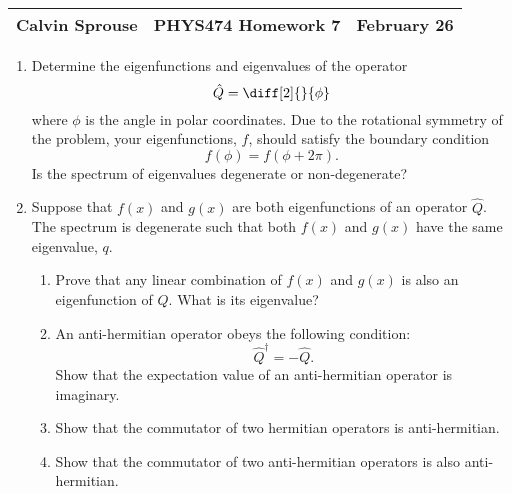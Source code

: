 \documentclass[a4paper, 12pt]{config/homework}
\begin{document}
\noindent
\begin{tabularx}{\textwidth}{>{\centering\arraybackslash}X>{\centering\arraybackslash}X>{\centering\arraybackslash}X}
Calvin Sprouse & PHYS474 Homework 7 & 2024 February 26\\
\midrule
\end{tabularx}

\begin{enumerate}
\item Determine the eigenfunctions and eigenvalues of the operator
\[\hat{Q} = \diff[2]{}{\phi}\]
where \(\phi\) is the angle in polar coordinates. Due to the rotational symmetry of the problem, your eigenfunctions, \(f\), should satisfy the boundary condition
\[f(\phi) = f(\phi + 2\pi).\]
Is the spectrum of eigenvalues degenerate or non-degenerate?



\pagebreak
\item Suppose that \(f(x)\) and \(g(x)\) are both eigenfunctions of an operator \(\hat{Q}\). The spectrum is degenerate such that both \(f(x)\) and \(g(x)\) have the same eigenvalue, \(q\).
\begin{enumerate}[label=(\alph*.)]
\item  Prove that any linear combination of \(f(x)\) and \(g(x)\) is also an eigenfunction of \(Q\). What is its eigenvalue?



\item An anti-hermitian operator obeys the following condition:
\[\hat{Q}^\dagger = -\hat{Q}.\]
Show that the expectation value of an anti-hermitian operator is imaginary.



\item Show that the commutator of two hermitian operators is anti-hermitian.



\item Show that the commutator of two anti-hermitian operators is also anti-hermitian.




\end{enumerate}
\end{enumerate}
\end{document}
